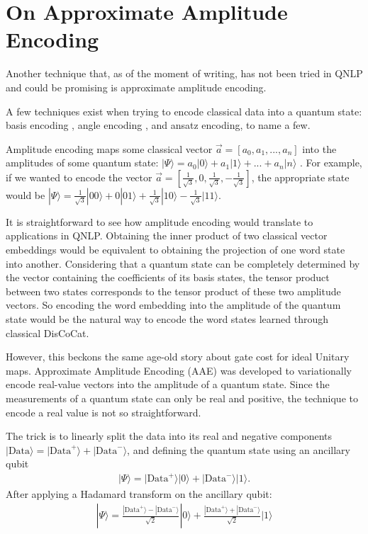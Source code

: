 \chapter{On Approximate Amplitude Encoding} \label{app:aae}

Another technique that, as of the moment of writing, has not been tried in QNLP and could be promising is approximate amplitude encoding.

A few techniques exist when trying to encode classical data into a quantum state: basis encoding \cite{li_efficient_2023}, angle encoding \cite{ovalle-magallanes_quantum_2023}, and ansatz encoding, to name a few.

Amplitude encoding maps some classical vector $\Vec{a}=[a_0,a_1,...,a_n]$ into the amplitudes of some quantum state: $|\Psi \rangle = a_0| 0 \rangle + a_1 | 1 \rangle +...+a_n|n\rangle$ \cite{larose_robust_2020}. For example, if we wanted to encode the vector $\Vec{a}=[\frac{1}{\sqrt{3}},0,\frac{1}{\sqrt{3}},-\frac{1}{\sqrt{3}}]$, the appropriate state would be $|\Psi \rangle = \frac{1}{\sqrt{3}}| 00 \rangle + 0 | 01 \rangle +\frac{1}{\sqrt{3}}|10\rangle-\frac{1}{\sqrt{3}}|11\rangle$. 

It is straightforward to see how amplitude encoding would translate to applications in QNLP. Obtaining the inner product of two classical vector embeddings would be equivalent to obtaining the projection of one word state into another. Considering that a quantum state can be completely determined by the vector containing the coefficients of its basis states, the tensor product between two states corresponds to the tensor product of these two amplitude vectors. So encoding the word embedding into the amplitude of the quantum state would be the natural way to encode the word states learned through classical DisCoCat.

However, this beckons the same age-old story about gate cost for ideal Unitary maps. Approximate Amplitude Encoding (AAE) was developed \cite{nakaji_approximate_2022} to variationally encode real-value vectors into the amplitude of a quantum state. Since the measurements of a quantum state can only be real and positive, the technique to encode a real value is not so straightforward.

The trick is to linearly split the data into its real and negative components $| \text{Data} \rangle = | \text{Data}^+ \rangle + | \text{Data}^- \rangle$, and defining the quantum state using an ancillary qubit
\begin{align}\label{eq:aaetrick}
    | \Psi \rangle = | \text{Data}^+ \rangle|0\rangle + | \text{Data}^- \rangle|1\rangle.
\end{align}
After applying a Hadamard transform on the ancillary qubit:
\begin{align}
    |\Psi \rangle  = \frac{| \text{Data}^+ \rangle - | \text{Data}^- \rangle}{\sqrt{2}}|0\rangle + \frac{| \text{Data}^+ \rangle + | \text{Data}^- \rangle}{\sqrt{2}}|1\rangle
\end{align}

